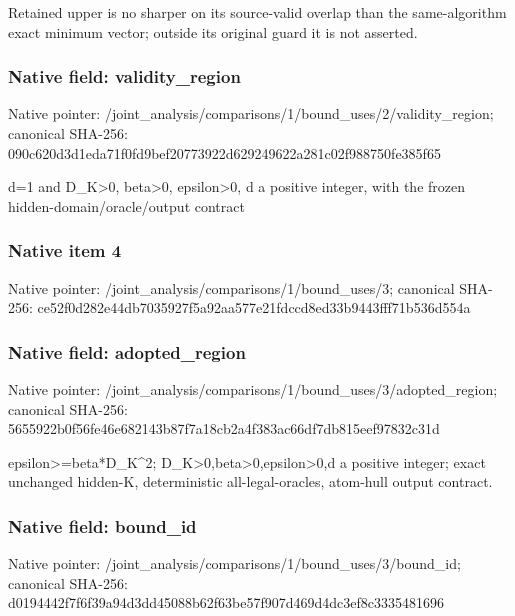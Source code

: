 \documentclass[10pt,a4paper]{article}
\begin{document}
\begingroup\raggedright\sloppy Retained upper is no sharper on its source-valid overlap than the same-algorithm exact minimum vector;\allowbreak{} outside its original guard it is not asserted.\par\endgroup

\subsubsection{Native field: validity\_\allowbreak{}region}
Native pointer: /joint\_\allowbreak{}analysis/comparisons/1/bound\_\allowbreak{}uses/2/validity\_\allowbreak{}region; canonical SHA-256: 090c620d3d1eda71f0fd9bef20773922d629249622a281c02f988750fe385f65

\begingroup\raggedright\sloppy d=\allowbreak{}1 and D\_\allowbreak{}K>0,\allowbreak{} beta>0,\allowbreak{} epsilon>0,\allowbreak{} d a positive integer,\allowbreak{} with the frozen hidden-domain/\allowbreak{}oracle/\allowbreak{}output contract\par\endgroup

\subsubsection{Native item 4}
Native pointer: /joint\_\allowbreak{}analysis/comparisons/1/bound\_\allowbreak{}uses/3; canonical SHA-256: ce52f0d282e44db7035927f5a92aa577e21fdccd8ed33b9443fff71b536d554a

\subsubsection{Native field: adopted\_\allowbreak{}region}
Native pointer: /joint\_\allowbreak{}analysis/comparisons/1/bound\_\allowbreak{}uses/3/adopted\_\allowbreak{}region; canonical SHA-256: 5655922b0f56fe46e682143b87f7a18cb2a4f383ac66df7db815eef97832c31d

\begingroup\raggedright\sloppy epsilon>=\allowbreak{}beta*D\_\allowbreak{}K\textasciicircum{}2;\allowbreak{} D\_\allowbreak{}K>0,\allowbreak{}beta>0,\allowbreak{}epsilon>0,\allowbreak{}d a positive integer;\allowbreak{} exact unchanged hidden-K,\allowbreak{} deterministic all-legal-oracles,\allowbreak{} atom-hull output contract.\par\endgroup

\subsubsection{Native field: bound\_\allowbreak{}id}
Native pointer: /joint\_\allowbreak{}analysis/comparisons/1/bound\_\allowbreak{}uses/3/bound\_\allowbreak{}id; canonical SHA-256: d0194442f7f6f39a94d3dd45088b62f63be57f907d469d4dc3ef8c3335481696
\end{document}
